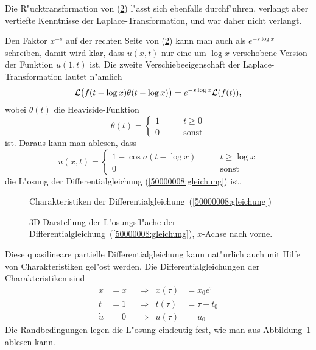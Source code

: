 \begin{diskussion}
Die R"ucktransformation von (\ref{50000008:loesung}) l"asst sich
ebenfalls durchf"uhren, verlangt aber vertiefte Kenntnisse der
Laplace-Transformation, und war daher nicht verlangt.

Den Faktor $x^{-s}$ auf der rechten Seite von (\ref{50000008:loesung})
kann man auch als $e^{-s\log x}$
schreiben, damit wird klar, dass $u(x,t)$ nur eine um $\log x$ verschobene
Version der Funktion $u(1,t)$ ist. 
Die zweite Verschiebeeigenschaft der Laplace-Transformation lautet n"amlich
\[
{\cal L}\bigl(f(t-\log x)\theta(t-\log x)\bigr)
=
e^{-s\log x}{\cal L}(f(t)),
\]
wobei $\theta(t)$ die Heaviside-Funktion
\[
\theta(t)=\begin{cases}1\qquad&t \ge 0\\ 0&\text{sonst}\end{cases}
\]
ist. Daraus kann man ablesen, dass
\begin{equation}
u(x,t)=\begin{cases}
1-\cos a(t-\log x)\qquad
&t \ge \log x\\
0
&\text{sonst}
\end{cases}
\label{50000008:ruecktransformiert}
\end{equation}
die L"osung der Differentialgleichung (\ref{50000008:gleichung}) ist.
\begin{figure}
\centering
{}
\caption{Charakteristiken der Differentialgleichung~(\ref{50000008:gleichung})
\label{50000008:charakteristiken}}
\end{figure}
\begin{figure}
\centering
{}
\caption{3D-Darstellung der L"osungsfl"ache der
Differentialgleichung~(\ref{50000008:gleichung}), $x$-Achse nach vorne.
\label{50000008:loesung}}
\end{figure}


Diese quasilineare partielle Differentialgleichung kann nat"urlich auch
mit Hilfe von Charakteristiken gel"ost werden.
Die Differentialgleichungen der Charakteristiken sind
\begin{equation}
\begin{aligned}
\dot x&=x&
&\Rightarrow&
x(\tau)&=x_0e^\tau
\\
\dot t&=1&
&\Rightarrow&
t(\tau)&=\tau + t_0
\\
\dot u&=0&
&\Rightarrow&
u(\tau)&=u_0
\end{aligned}
\label{50000008:chardgl}
\end{equation}
Die Randbedingungen legen die L"osung eindeutig fest, wie man aus
Abbildung~\ref{50000008:charakteristiken} ablesen kann.


\end{diskussion}
